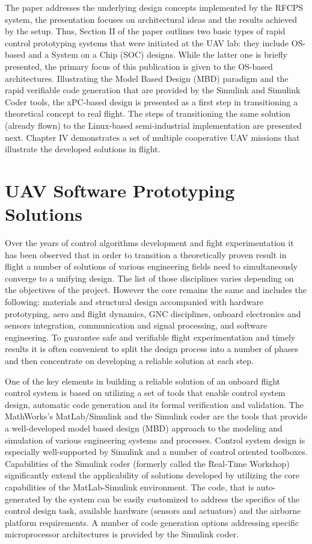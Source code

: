 \documentclass[letterpaper, 10 pt, conference]{ieeeconf}  %
\begin{document}
The paper  addresses  the underlying design concepts implemented by the RFCPS system, the presentation focuses on architectural ideas and the results achieved by the setup. Thus, Section II of the paper outlines two basic types of rapid control prototyping systems that were initiated at the UAV lab: they include OS-based and a System on a Chip (SOC) designs. While the latter one is briefly presented, the primary focus of this publication is given to the OS-based architectures. Illustrating the Model Based Design (MBD) paradigm and the rapid verifiable code generation that are provided by the Simulink and Simulink Coder tools, the xPC-based design is presented as a first step in transitioning a theoretical concept to real flight.  The steps of transitioning the same solution (already flown) to the Linux-based semi-industrial implementation are presented next. Chapter IV demonstrates a set of multiple cooperative UAV missions that illustrate the developed solutions in flight. 

\section{UAV Software Prototyping Solutions}

Over the years of control algorithms development and fight experimentation it has been observed that in order to transition a theoretically proven result in flight a number of solutions of various engineering fields need to simultaneously converge to a unifying design. The list of those disciplines varies depending on the objectives of the project. However the core remains the same and includes the following: materials and structural design accompanied with hardware prototyping, aero and flight dynamics, GNC disciplines, onboard electronics and sensors integration, communication and signal processing, and software engineering. To guarantee safe and verifiable flight experimentation and timely results it is often convenient to split the design process into a number of phases and then concentrate on developing a reliable solution at each step. 

One of the key elements in building a reliable solution of an onboard flight control system is based on utilizing a set of tools that enable control  system design, automatic code generation and its formal verification and validation. The MathWorks's MatLab/Simulink and the Simulink coder are the tools that provide a well-developed model based design (MBD) approach to the modeling and  simulation of various engineering systems and processes. Control system design is especially well-supported by Simulink and a number of control oriented toolboxes. Capabilities of the Simulink coder (formerly called the Real-Time Workshop) significantly extend the applicability of solutions developed by utilizing the core capabilities of the MatLab-Simulink environment. The code, that is auto-generated by the system can be easily customized to address the specifics of the control design task, available hardware (sensors and actuators) and the airborne platform requirements. A number of code generation options addressing specific microprocessor architectures is provided by the Simulink coder.
\end{document}
